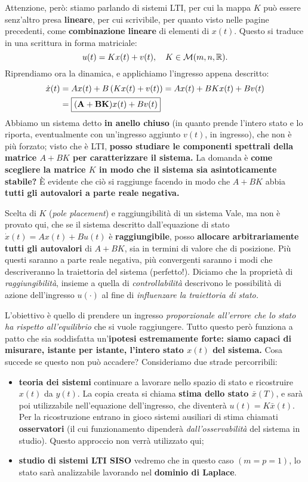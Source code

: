 \documentclass[a4paper]{report}
\begin{document}
\bb
Attenzione, però: stiamo parlando di sistemi LTI, per cui la mappa $K$ può essere senz'altro presa \textbf{lineare}, per cui scrivibile, per quanto visto nelle pagine precedenti, come \textbf{combinazione lineare} di elementi di $x(t)$. Questo si traduce in una scrittura in forma matriciale:
\begin{equation}
	u(t) = Kx(t) + v(t), \quad K \in \mathcal{M}(m,n,\mathbb{R}).
\end{equation}
Riprendiamo ora la dinamica, e applichiamo l'ingresso appena descritto:
\begin{align}
	\dot x(t) & = Ax(t) + B\left( Kx(t) + v(t) \right) = Ax(t) + BKx(t) + Bv(t) \nonumber \\ & = \boxed{\mathbf{(A+BK)}x(t) + Bv(t)}
\end{align}
Abbiamo un sistema detto \textbf{in anello chiuso} (in quanto prende l'intero stato e lo riporta, eventualmente con un'ingresso aggiunto $v(t)$, in ingresso), che non è più forzato; visto che è LTI, \textbf{posso studiare le componenti spettrali della matrice $A+BK$ per caratterizzare il sistema.} La domanda è \textbf{come scegliere la matrice $K$ in modo che il sistema sia asintoticamente stabile?} È evidente che ciò si raggiunge facendo in modo che $A+BK$ abbia \textbf{tutti gli autovalori a parte reale negativa.}
\bb
\begin{defin}{Scelta di $K$ (\textit{pole placement}) e raggiungibilità di un sistema}{}
Vale, ma non è provato qui, che se il sistema descritto dall'equazione di stato $\dot x(t)=Ax(t)+Bu(t)$ è \textbf{raggiungibile}, posso \textbf{allocare arbitrariamente tutti gli autovalori} di $A+BK$, sia in termini di valore che di posizione. Più questi saranno a parte reale negativa, più convergenti saranno i modi che descriveranno la traiettoria del sistema (perfetto!).
\bb
Diciamo che la proprietà di \textit{raggiungibilità}, insieme a quella di \textit{controllabilità} descrivono le possibilità di azione dell'ingresso $u(\cdot)$ al fine di \textit{influenzare la traiettoria di stato.}	
\end{defin}
L'obiettivo è quello di prendere un ingresso \textit{proporzionale all'errore che lo stato ha rispetto all'equilibrio} che si vuole raggiungere. Tutto questo però funziona a patto che sia soddisfatta un'\textbf{ipotesi estremamente forte: siamo capaci di misurare, istante per istante, l'intero stato $x(t)$ del sistema.} Cosa succede se questo non può accadere? Consideriamo due strade percorribili:
\begin{itemize}
	\item \textbf{teoria dei sistemi} \rarr continuare a lavorare nello spazio di stato e ricostruire $x(t)$ da $y(t)$. La copia creata si chiama \textbf{stima dello stato $\bar x(T)$}, e sarà poi utilizzabile nell'equazione dell'ingresso, che diventerà $u(t) = K\bar x(t)$. Per la ricostruzione entrano in gioco sistemi ausiliari di stima chiamati \textbf{osservatori} (il cui funzionamento dipenderà \textit{dall'osservabilità} del sistema in studio). Questo approccio non verrà utilizzato qui;
	\item \textbf{studio di sistemi LTI SISO} \rarr vedremo che in questo caso $(m = p = 1)$, lo stato sarà analizzabile lavorando nel \textbf{dominio di Laplace}.
\end{itemize}
\end{document}
